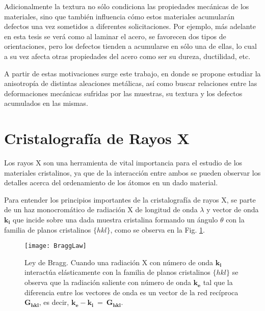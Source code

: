 Adicionalmente la textura no sólo condiciona las propiedades mecánicas de los materiales, sino que también influencia cómo estos materiales acumularán defectos una vez sometidos a diferentes solicitaciones. 
Por ejemplo, más adelante en esta tesis se verá como al laminar el acero, se favorecen dos tipos de orientaciones, pero los defectos tienden a acumularse en sólo una de ellas, lo cual a su vez afecta otras propiedades del acero como ser su dureza, ductilidad, etc.

A partir de estas motivaciones surge este trabajo, en donde se propone estudiar la anisotropía de distintas aleaciones metálicas, así como buscar relaciones entre las deformaciones mecánicas sufridas por las muestras, su textura y los defectos acumulados en las mismas.

\section{Cristalografía de Rayos X}\label{S:DRX}
Los rayos X son una herramienta de vital importancia para el estudio de los materiales cristalinos, ya que de la interacción entre ambos se pueden observar los detalles acerca del ordenamiento de los átomos en un dado material.

Para entender los principios importantes de la cristalografía de rayos X, se parte de un haz monocromático de radiación X de longitud de onda $\lambda$ y vector de onda $\mathbf{k_i}$ que incide sobre una dada muestra cristalina formando un ángulo $\theta$ con la familia de planos cristalinos $\{hkl\}$, como se observa en la Fig. \ref{fig:Bragg}.

\begin{figure}[htb!]
  \centering
  \texttt{[image: BraggLaw]}
  \caption{Ley de Bragg. Cuando una radiación X con número de onda $\mathbf{k_i}$ interactúa elásticamente con la familia de planos cristalinos $\{hkl\}$ se observa que la radiación saliente con número de onda $\mathbf{k_e}$ tal que la diferencia entre los vectores de onda es un vector de la red recíproca $\mathbf{G_{hkl}}$, es decir, $\mathbf{k_e} - \mathbf{k_i} \ = \ \mathbf{G_{hkl}}$.}
  \label{fig:Bragg}
\end{figure}

